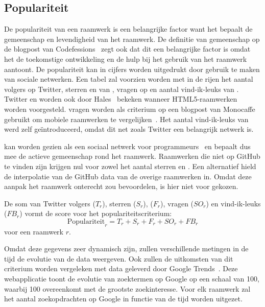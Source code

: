 \subsection{Populariteit}
\label{sec:vergelijking-populariteit}
De populariteit van een raamwerk is een belangrijke factor want het bepaalt de gemeenschap en levendigheid van het raamwerk.
De definitie van gemeenschap op de blogpost van Codefessions~\cite{Sarrafi2012a} zegt ook dat dit een belangrijke factor is omdat het de toekomstige ontwikkeling en de hulp bij het gebruik van het raamwerk aantoont. 
De populariteit kan in cijfers worden uitgedrukt door gebruik te maken van sociale netwerken. 
Een tabel zal voorzien worden met in de rijen het aantal volgers op Twitter, sterren en  van \gh{},  vragen op \so{} en aantal vind-ik-leuks van \fb{}.
Twitter en \gh{} worden ook door Hales~\cite{Hales2012} bekeken wanneer HTML5-raamwerken worden voorgesteld.
\so{} vragen worden als criterium op een blogpost van Monocaffe gebruikt om mobiele raamwerken te vergelijken~\cite{Ayuso2012}.  
Het aantal vind-ik-leuks van \fb{} werd zelf geïntroduceerd, omdat dit net zoals Twitter een belangrijk netwerk is.

\gh{} kan worden gezien als een sociaal netwerk voor programmeurs~\cite{Catone2008} en bepaalt dus mee de actieve gemeenschap rond het raamwerk.
Raamwerken die niet op GitHub te vinden zijn krijgen nul voor zowel het aantal sterren en .
Een alternatief hield de interpolatie van de GitHub data van de overige raamwerken in.
Omdat deze aanpak het raamwerk onterecht zou bevoordelen, is hier niet voor gekozen.

De som van Twitter volgers ($T_r$), \gh{} sterren ($S_r$), \gh{}  ($F_r$), \so{} vragen ($SO_r$) en \fb{} vind-ik-leuks ($FB_r$) vormt de score voor het populariteitscriterium:
\begin{equation}
  \text{Populariteit}_r=T_r+S_r+F_r+SO_r+FB_r
  \label{eq:populariteit}
\end{equation}
voor een raamwerk $r$.

Omdat deze gegevens zeer dynamisch zijn, zullen verschillende metingen in de tijd de evolutie van de data weergeven.
Ook zullen de uitkomsten van dit criterium worden vergeleken met data geleverd door Google Trends~\cite{Google2012a}.
Deze webapplicatie toont de evolutie van zoektermen op Google op een schaal van 100, waarbij 100 overeenkomt met de grootste zoekinteresse.
Voor elk raamwerk zal het aantal zoekopdrachten op Google in functie van de tijd worden uitgezet.

